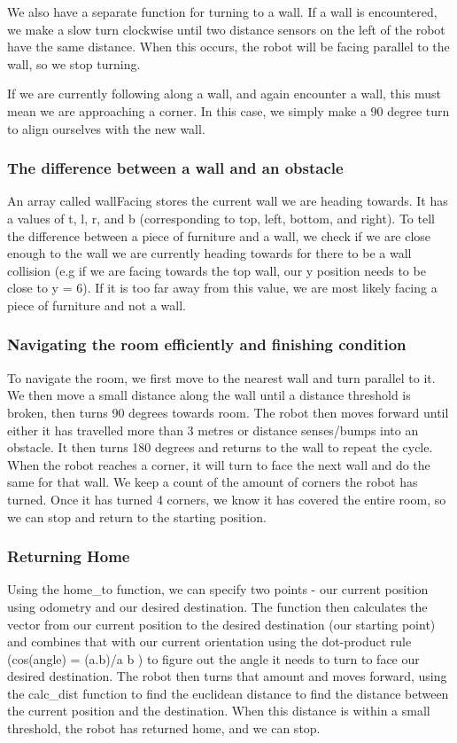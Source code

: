 \documentclass[11pt, a4paper]{article}
\begin{document}
We also have a separate function for turning to a wall. If a wall is encountered, we make a slow turn clockwise until two distance sensors on the left of the robot have the same distance. When this occurs, the robot will be facing parallel to the wall, so we stop turning.

If we are currently following along a wall, and again encounter a wall, this must mean we are approaching a corner. In this case, we simply make a 90 degree turn to align ourselves with the new wall.

\subsubsection*{The difference between a wall and an obstacle}
An array called wallFacing stores the current wall we are heading towards. It has a values of t, l, r, and b (corresponding to top, left, bottom, and right). To tell the difference between a piece of furniture and a wall, we check if we are close enough to the wall we are currently heading towards for there to be a wall collision (e.g if we are facing towards the top wall, our y position needs to be close to y = 6). If it is too far away from this value, we are most likely facing a piece of furniture and not a wall.

\subsubsection*{Navigating the room efficiently and finishing condition}
To navigate the room, we first move to the nearest wall and turn parallel to it. We then move a small distance along the wall until a distance threshold is broken, then turns 90 degrees towards room. The robot then moves forward until either it has travelled more than 3 metres or distance senses/bumps into an obstacle. It then turns 180 degrees and returns to the wall to repeat the cycle. When the robot reaches a corner, it will turn to face the next wall and do the same for that wall. We keep a count of the amount of corners the robot has turned. Once it has turned 4 corners, we know it has covered the entire room, so we can stop and return to the starting position.
\subsubsection*{Returning Home}
Using the home\_to function, we can specify two points - our current position using odometry and our desired destination. The function then calculates the vector from our current position to the desired destination (our starting point) and combines that with our current orientation using the dot-product rule (cos(angle) = (a.b)/\textbar a \textbar \textbar b \textbar) to figure out the angle it needs to turn to face our desired destination. The robot then turns that amount and moves forward, using the calc\_dist function to find the euclidean distance to find the distance between the current position and the destination. When this distance is within a small threshold, the robot has returned home, and we can stop.
\end{document}
